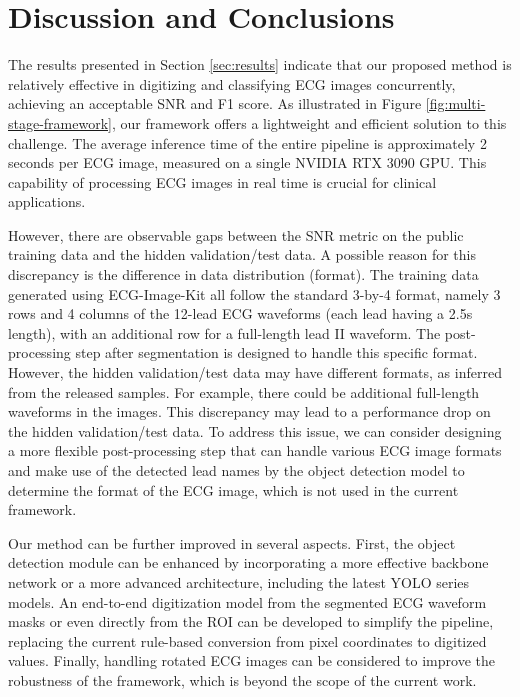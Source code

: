 \section{Discussion and Conclusions}
\label{sec:discu}


The results presented in Section \ref{sec:results} indicate that our proposed method is relatively effective in digitizing and classifying ECG images concurrently, achieving an acceptable SNR and F1 score. As illustrated in Figure \ref{fig:multi-stage-framework}, our framework offers a lightweight and efficient solution to this challenge. The average inference time of the entire pipeline is approximately 2 seconds per ECG image, measured on a single NVIDIA RTX 3090 GPU. This capability of processing ECG images in real time is crucial for clinical applications.

However, there are observable gaps between the SNR metric on the public training data and the hidden validation/test data. A possible reason for this discrepancy is the difference in data distribution (format). The training data generated using ECG-Image-Kit \cite{Shivashankara_2024_ECG} all follow the standard 3-by-4 format, namely 3 rows and 4 columns of the 12-lead ECG waveforms (each lead having a 2.5s length), with an additional row for a full-length lead II waveform. The post-processing step after segmentation is designed to handle this specific format. However, the hidden validation/test data may have different formats, as inferred from the released samples. For example, there could be additional full-length waveforms in the images. This discrepancy may lead to a performance drop on the hidden validation/test data. To address this issue, we can consider designing a more flexible post-processing step that can handle various ECG image formats and make use of the detected lead names by the object detection model to determine the format of the ECG image, which is not used in the current framework.

Our method can be further improved in several aspects. First, the object detection module can be enhanced by incorporating a more effective backbone network or a more advanced architecture, including the latest YOLO series models. An end-to-end digitization model from the segmented ECG waveform masks or even directly from the ROI can be developed to simplify the pipeline, replacing the current rule-based conversion from pixel coordinates to digitized values. Finally, handling rotated ECG images can be considered to improve the robustness of the framework, which is beyond the scope of the current work.
